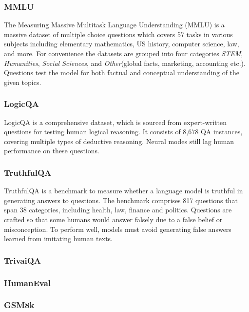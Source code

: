 \documentclass[11pt]{article}
\begin{document}
\subsubsection{MMLU}

The Measuring Massive Multitask Language Understanding (MMLU) 
\cite{hendryckstest2021} \cite{hendrycks2021ethics} is a massive dataset of 
multiple choice questions which covers 57 tasks in various subjects including elementary mathematics, 
US history, computer science, law, and more. For convenience the datasets are grouped into 
four categories \emph{STEM}, \emph{Humanities}, \emph{Social Sciences}, 
and \emph{Other}(global facts, marketing, accounting etc.). 
Questions test the model for both factual and conceptual understanding 
of the given topics.

\subsubsection{LogicQA}

LogicQA \cite{liu2020logiqa} is a comprehensive dataset, which is sourced 
from expert-written questions for testing human logical reasoning. It consists of 8,678 QA 
instances, covering multiple types of deductive reasoning. Neural modes 
still lag human performance on these questions.

\subsubsection{TruthfulQA}

TruthfulQA \cite{lin2021truthfulqa} is a benchmark to measure whether 
a language model is truthful in generating answers to questions. The benchmark comprises 
817 questions that span 38 categories, including health, law, finance and politics. 
Questions are crafted so that some humans would answer falsely due to a false belief or misconception. 
To perform well, models must avoid generating false answers learned from imitating human texts.  

\subsubsection{TrivaiQA}

\subsubsection{HumanEval}

\subsubsection{GSM8k}
\end{document}

